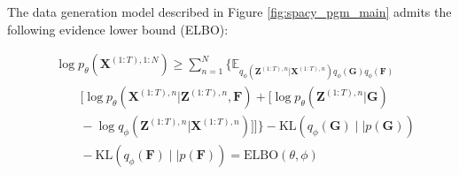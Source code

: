 \begin{proposition}
    The data generation model described in Figure \ref{fig:spacy_pgm_main} admits the following evidence lower bound (ELBO):
    \begin{small}
    \begin{align}
        & \log p_{\theta}\left( \mathbf{X}^{(1:T), 1:N} \right) \geq \sum_{n=1}^N \Bigg\{ \mathbb{E}_{q_{\phi}(\mathbf{Z}^{(1:T), n}|\mathbf{X}^{(1:T), n}) q_{\phi}(\mathbf{G}) q_{\phi}(\mathbf{F})}  \nonumber \\
        & \qquad \Bigg[ {\log p_{\theta}\left( \mathbf{X}^{(1:T), n} | \mathbf{Z}^{(1:T), n}, \mathbf{F} \right)} \nonumber + \Big[ \log p_{\theta}\left(\mathbf{Z}^{(1:T), n} | \mathbf{G} \right) \\
        &\qquad - \log q_{\phi}\left(\mathbf{Z}^{(1:T), n} | \mathbf{X}^{(1:T), n}\right) \Big] \Bigg] \Bigg\} - \text{KL}\left( q_\phi(\mathbf{G}) \mid \mid  p(\mathbf{G})  \right) \nonumber\\
         & \qquad - \text{KL}\left( q_\phi(\mathbf{F}) \mid \mid  p(\mathbf{F})  \right) = \text{ELBO}(\theta,\phi)     \label{eqn:elbo}
    \end{align}
    \end{small}

\end{proposition}
